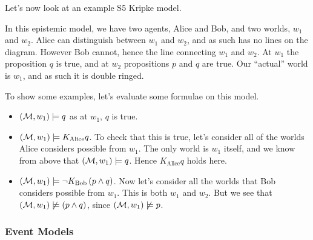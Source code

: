 \documentclass[12pt, a4paper]{article}
\begin{document}
\bigskip \bigskip \bigskip

Let's now look at an example \textsf{S5} Kripke model.

\begin{center}
\end{center}

In this epistemic model, we have two agents, Alice and Bob, and two worlds,
$w_1$ and $w_2$. Alice can distinguish between $w_1$ and $w_2$, and as such has
no lines on the diagram. However Bob cannot, hence the line connecting $w_1$ and
$w_2$. At $w_1$ the proposition $q$ is true, and at $w_2$ propositions $p$ and
$q$ are true. Our ``actual'' world is $w_1$, and as such it is double ringed. 

To show some examples, let's evaluate some formulae on this model.

\begin{itemize}
\item $(\mathcal{M}, w_1) \models q$ as at $w_1$, $q$ is true.
\item $(\mathcal{M}, w_1) \models K_{\text{Alice}} q$. To check that this is true, let's
  consider all of the worlds Alice considers possible from $w_1$. The only world
  is $w_1$ itself, and we know from above that $(\mathcal{M}, w_1) \models q$. Hence
  $K_{\text{Alice}} q$ holds here.
\item $(\mathcal{M}, w_1) \models \neg K_{\text{Bob}} \left( p \land q \right)$. Now
  let's consider all the worlds that Bob considers possible from $w_1$. This is
  both $w_1$ and $w_2$. But we see that $(\mathcal{M}, w_1) \not \models (p \land
  q)$, since $(\mathcal{M}, w_1) \not \models p$. 
\end{itemize}

\subsubsection{Event Models}
\label{sec:Event Models}
\end{document}
